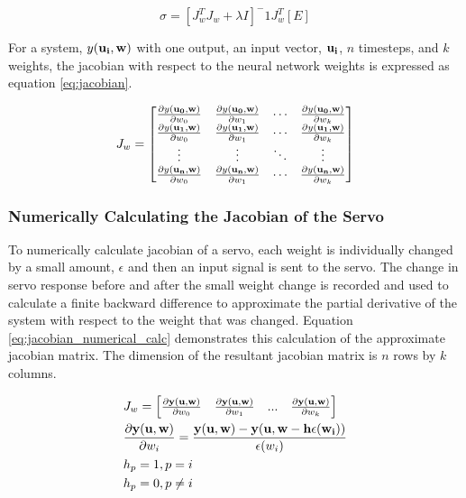\documentclass[letterpaper,12pt]{article}
\newcommand{\di}{\partial}
\begin{document}
\begin{equation}
	\label{eq:levenberg_solved}
	\sigma = [J_w^T J_w + \lambda I]^-1 J_w^T [E]
\end{equation}

For a system, $y(\bf{u_i}, w)$ with one output, an input vector, $\bf{u_i}$, $n$ timesteps, and $k$ weights, the jacobian with respect to the neural network weights is expressed as equation \ref{eq:jacobian}.

\begin{equation}
	\label{eq:jacobian}
	J_w = \begin{bmatrix}
		\frac{\di y(\bf{u_0}, \bf{w})}{\di w_0} & \frac{\di y(\bf{u_0}, \bf{w})}{\di w_1} & \cdots & \frac{\di y(\bf{u_0}, \bf{w})}{\di w_k} \\
		\frac{\di y(\bf{u_1}, \bf{w})}{\di w_0} & \frac{\di y(\bf{u_1}, \bf{w})}{\di w_1} & \cdots & \frac{\di y(\bf{u_1}, \bf{w})}{\di w_k} \\
		\vdots & \vdots & \ddots & \vdots \\
		\frac{\di y(\bf{u_n}, \bf{w})}{\di w_0} & \frac{\di y(\bf{u_n}, \bf{w})}{\di w_1} & \cdots & \frac{\di y(\bf{u_n}, \bf{w})}{\di w_k}


	\end{bmatrix}
\end{equation}

\subsubsection{Numerically Calculating the Jacobian of the Servo}\label{sec:numerical_jacobian}
To numerically calculate jacobian of a servo, each weight is individually changed by a small amount, $\epsilon$ and then an input signal is sent to the servo. The change in servo response before and after the small weight change is recorded and used to calculate a finite backward difference to approximate the partial derivative of the system with respect to the weight that was changed. Equation \ref{eq:jacobian_numerical_calc} demonstrates this calculation of the approximate jacobian matrix. The dimension of the resultant jacobian matrix is $n$ rows by $k$ columns.

\begin{equation}
\begin{split}
	\label{eq:jacobian_numerical_calc}
	& J_w = \begin{bmatrix}
		\frac{\di \bf{y}(\bf{u}, \bf{w})}{\di w_0} & \frac{\di \bf{y}(\bf{u}, \bf{w})}{\di w_1} & ... & \frac{\di \bf{y}(\bf{u}, \bf{w})}{\di w_k}
	\end{bmatrix} \\
	& \frac{\di \bf{y}(\bf{u}, \bf{w})}{\di w_i} = \frac{\bf{y}(\bf{u}, \bf{w}) - \bf{y}(\bf{u}, \bf{w} - \bf{h}\epsilon(w_i))}{\epsilon(w_i)} \\
	& h_p = 1, p = i \\
	& h_p = 0, p \neq i
\end{split}
\end{equation}
\end{document}
